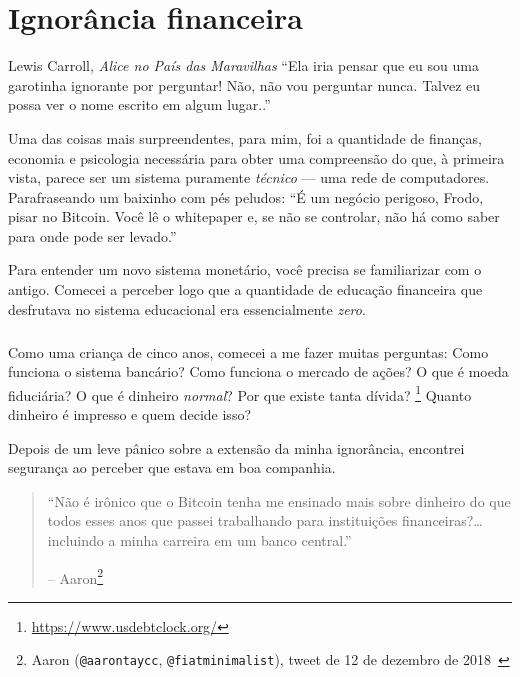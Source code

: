 \chapter{Ignorância financeira}
\label{les:8}

\begin{chapquote}{Lewis Carroll, \textit{Alice no País das Maravilhas}}
\enquote{Ela iria pensar que eu sou uma garotinha ignorante por perguntar! Não, não vou perguntar nunca. Talvez eu possa ver o nome escrito em algum lugar..}
\end{chapquote}

Uma das coisas mais surpreendentes, para mim, foi a quantidade de finanças, economia e psicologia necessária para obter uma compreensão do que, à primeira vista, parece ser um sistema puramente \textit{técnico} --- uma rede de computadores. Parafraseando um baixinho com pés peludos: \enquote{É um negócio perigoso, Frodo, pisar no Bitcoin. Você lê o whitepaper e, se não se controlar, não há como saber para onde pode ser levado.}

Para entender um novo sistema monetário, você precisa se familiarizar com o antigo. Comecei a perceber logo que a quantidade de educação financeira que desfrutava no sistema educacional era essencialmente \textit{zero}.

\paragraph{}
Como uma criança de cinco anos, comecei a me fazer muitas perguntas: Como funciona o sistema bancário? Como funciona o mercado de ações? O que é moeda fiduciária? O que é dinheiro \textit{normal}? Por que existe tanta dívida? \footnote{\url{https://www.usdebtclock.org/}} Quanto dinheiro é impresso e quem decide isso?

\newpage

Depois de um leve pânico sobre a extensão da minha ignorância, encontrei segurança ao perceber que estava em boa companhia.

\begin{quotation}\begin{samepage}
\enquote{Não é irônico que o Bitcoin tenha me ensinado mais sobre dinheiro do que todos esses anos que passei trabalhando para instituições financeiras?\ldots incluindo a minha carreira em um banco central.}
\begin{flushright} -- Aaron\footnote{Aaron (\texttt{@aarontaycc}, \texttt{@fiatminimalist}), tweet de 12 de dezembro de 2018~\cite{aarontaycc-tweet}}
\end{flushright}\end{samepage}\end{quotation}

